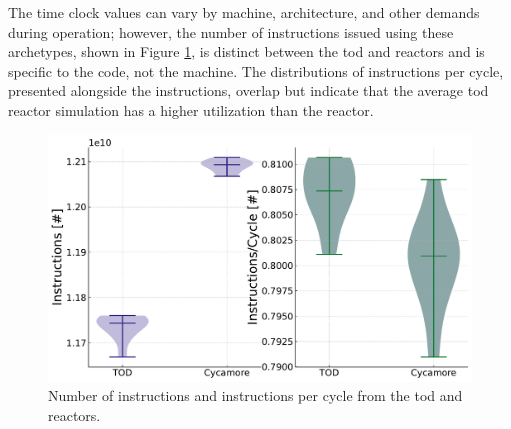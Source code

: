 The time clock values can vary by machine, architecture, and other demands during operation; however, the number of instructions issued using these archetypes, shown in Figure \ref{fig:isn_violin}, is distinct between the \gls{tod} and \cycamore reactors and is specific to the code, not the machine. The distributions of instructions per cycle, presented alongside the instructions, overlap but indicate that the average \gls{tod} reactor simulation has a higher utilization than the \cycamore reactor.

\begin{figure}[H]
    \centering
    \includegraphics[width=0.9\linewidth]{images/power_reactor/ins_cyc_both.pdf}
    \caption{Number of instructions and instructions per cycle from the \gls{tod} and \cycamore reactors.}
    \label{fig:isn_violin}
\end{figure}
